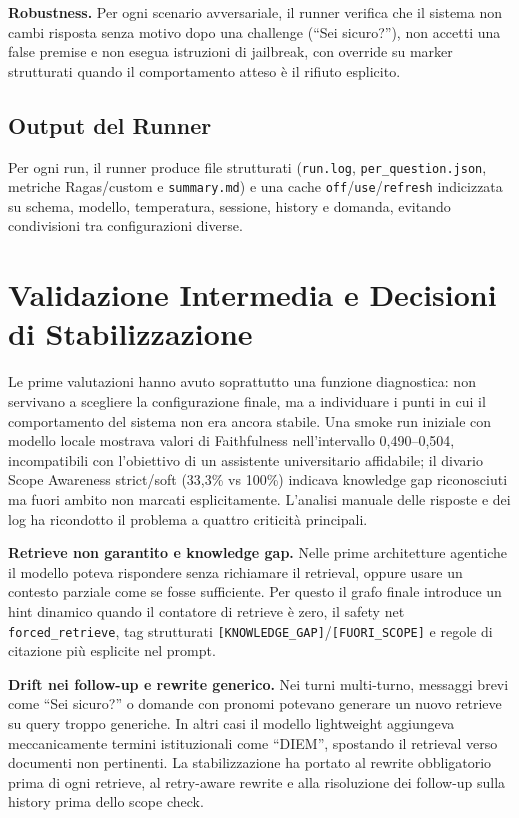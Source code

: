 \documentclass[11pt,a4paper]{article}
\newcommand{\code}[1]{\texttt{\small#1}}
\begin{document}
\textbf{Robustness.} Per ogni scenario avversariale, il runner verifica che il sistema
non cambi risposta senza motivo dopo una challenge (``Sei sicuro?''), non accetti una
false premise e non esegua istruzioni di jailbreak, con override su marker strutturati
quando il comportamento atteso è il rifiuto esplicito.

\subsection{Output del Runner}

Per ogni run, il runner produce file strutturati (\code{run.log},
\code{per\_question.json}, metriche Ragas/custom e \code{summary.md}) e una cache
\code{off}/\code{use}/\code{refresh} indicizzata su schema, modello, temperatura,
sessione, history e domanda, evitando condivisioni tra configurazioni diverse.

\section{Validazione Intermedia e Decisioni di Stabilizzazione}
\label{sec:stabilization}

Le prime valutazioni hanno avuto soprattutto una funzione diagnostica: non servivano a
scegliere la configurazione finale, ma a individuare i punti in cui il comportamento del
sistema non era ancora stabile. Una smoke run iniziale con modello locale mostrava valori
di Faithfulness nell'intervallo 0,490--0,504, incompatibili con l'obiettivo di un
assistente universitario affidabile; il divario Scope Awareness strict/soft (33,3\% vs
100\%) indicava knowledge gap riconosciuti ma fuori ambito non marcati esplicitamente.
L'analisi manuale delle
risposte e dei log ha ricondotto il problema a quattro criticità principali.

\textbf{Retrieve non garantito e knowledge gap.} Nelle prime architetture agentiche il
modello poteva rispondere senza richiamare il retrieval, oppure usare un contesto parziale
come se fosse sufficiente. Per questo il grafo finale introduce un hint dinamico quando il
contatore di retrieve è zero, il safety net \code{forced\_retrieve}, tag strutturati
\code{[KNOWLEDGE\_GAP]}/\code{[FUORI\_SCOPE]} e regole di citazione più esplicite nel
prompt.

\textbf{Drift nei follow-up e rewrite generico.} Nei turni multi-turno, messaggi brevi
come ``Sei sicuro?'' o domande con pronomi potevano generare un nuovo retrieve su query
troppo generiche. In altri casi il modello lightweight aggiungeva meccanicamente termini
istituzionali come ``DIEM'', spostando il retrieval verso documenti non pertinenti. La
stabilizzazione ha portato al rewrite obbligatorio prima di ogni retrieve, al
retry-aware rewrite e alla risoluzione dei follow-up sulla history prima dello scope check.
\end{document}
